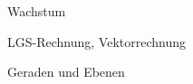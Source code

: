 


\begin{inhalt}
	\item Wachstum
	\item LGS-Rechnung, Vektorrechnung
	\item Geraden und Ebenen
\end{inhalt}




